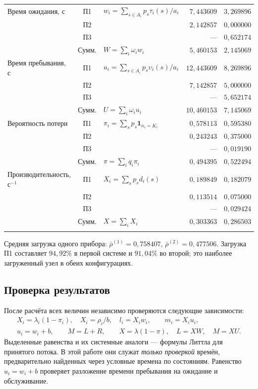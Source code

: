 \documentclass[a4paper,12pt]{article}
\begin{document}
\begin{table}[H]
\begin{tabular}{@{}>{\raggedright\arraybackslash}p{3.0cm}c p{5.3cm}rr@{}}
\addlinespace[3pt]
Время ожидания, с & П1 & $w_i=\sum_{s\in A_i}p_s\tau_i(s)/a_i$ & $7{,}443609$ & $3{,}269896$ \\
 & П2 &  & $2{,}142857$ & $0{,}000000$ \\
 & П3 &  & --- & $0{,}652174$ \\
 & Сумм. & $W=\sum_i\omega_i w_i$ & $5{,}460153$ & $2{,}145069$ \\
\addlinespace[3pt]
Время пребывания, с & П1 & $u_i=\sum_{s\in A_i}p_s\upsilon_i(s)/a_i$ & $12{,}443609$ & $8{,}269896$ \\
 & П2 &  & $7{,}142857$ & $5{,}000000$ \\
 & П3 &  & --- & $5{,}652174$ \\
 & Сумм. & $U=\sum_i\omega_i u_i$ & $10{,}460153$ & $7{,}145069$ \\
\addlinespace[3pt]
Вероятность потери & П1 & $\pi_i=\sum_s p_s\mathbf1_{n_i=K_i}$ & $0{,}578113$ & $0{,}595380$ \\
 & П2 &  & $0{,}243243$ & $0{,}375000$ \\
 & П3 &  & --- & $0{,}019190$ \\
 & Сумм. & $\pi=\sum_i q_i\pi_i$ & $0{,}494395$ & $0{,}522494$ \\
\addlinespace[3pt]
Производи\-тельность, $\text{с}^{-1}$ & П1 & $X_i=\sum_s p_s d_i(s)$ & $0{,}189849$ & $0{,}182079$ \\
 & П2 &  & $0{,}113514$ & $0{,}075000$ \\
 & П3 &  & --- & $0{,}029424$ \\
 & Сумм. & $X=\sum_i X_i$ & $0{,}303363$ & $0{,}286503$ \\
\addlinespace[3pt]
\bottomrule\end{tabular}
\end{table}
Средняя загрузка одного прибора: $\bar\rho^{(1)}=0{,}758407$, $\bar\rho^{(2)}=0{,}477506$. Загрузка П1 составляет $94{,}92\%$ в первой системе и $91{,}04\%$ во второй; это наиболее загруженный узел в обеих конфигурациях.

\subsection{Проверка результатов}\label{sec:checks}
После расчёта всех величин независимо проверяются следующие зависимости:
\begin{gather}
X_i=\lambda_i(1-\pi_i),\quad X_i=\rho_i/b,\quad
\boxed{l_i=X_iw_i,\qquad m_i=X_iu_i},\\
u_i=w_i+b,\qquad M=L+R,\qquad
X=\lambda(1-\pi),\quad L=XW,\quad M=XU.
\end{gather}
Выделенные равенства и их системные аналоги --- формулы Литтла для принятого потока. В этой работе они служат \emph{только проверкой} времён, предварительно найденных через условные времена по состояниям. Равенство $u_i=w_i+b$ проверяет разложение времени пребывания на ожидание и обслуживание.
\end{document}
